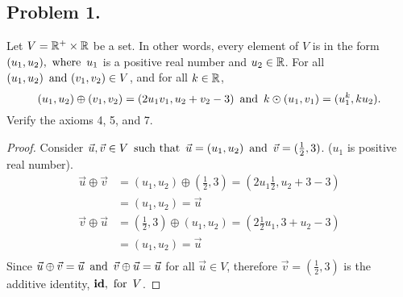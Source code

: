 





\subsection*{Problem 1.}
Let $V = \mathbb{R}^+ \times \mathbb{R}$ be a set. In other words, every element of $V$ is in the form $(u_1, u_2), \operatorname{~\text{where}~} u_1$ is a positive real number and $u_2 \in \mathbb{R}$. For all $(u_1,u_2) \operatorname{~\text{and}~} (v_1,v_2) \in V$, and for all $k \in \mathbb{R}$,
\[
  (u_1,u_2) \oplus (v_1,v_2) = (2u_1v_1, u_2 + v_2 - 3) \operatorname{~\text{and}~} k \odot (u_1,v_1) = (u_1^k, ku_2).
\]
Verify the axioms 4, 5, and 7.

\begin{enumerate}
  \begin{proof}
    Consider $\vec{u}, \vec{v} \in V \operatorname{~\text{such that}~} \vec{u} = (u_1, u_2) \operatorname{~\text{and}~} \vec{v} = (\frac{1}{2}, 3)$. ($u_1$ is positive real number).
    \begin{align*}
      \vec{u} \oplus \vec{v} & = (u_1, u_2) \oplus \left(\frac{1}{2}, 3\right) = \left(2u_1\frac{1}{2}, u_2 + 3 - 3\right) \\
                             & = (u_1, u_2) = \vec{u}                                                                      \\
      \vec{v} \oplus \vec{u} & = \left(\frac{1}{2}, 3\right) \oplus (u_1, u_2) = \left(2\frac{1}{2}u_1, 3 + u_2 - 3\right) \\
                             & = (u_1, u_2) = \vec{u}                                                                      \\
    \end{align*}
    Since $\vec{u} \oplus \vec{v} = \vec{u} \operatorname{~\text{and}~} \vec{v} \oplus \vec{u} = \vec{u}$ for all $\vec{u} \in V$, therefore $\vec{v} = (\frac{1}{2}, 3)$ is the additive identity, $\operatorname{\textbf{id}},\operatorname{~\text{for}~} V$.


\end{proof}
\end{enumerate}
